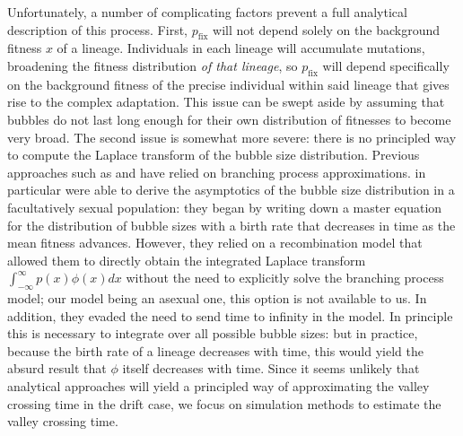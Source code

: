 \documentclass[10pt,twocolumn,twoside]{gsajnl}
\newcommand{\pfix}{p_{\mathrm{fix}}}
\begin{document}
\begin{spacing}{1.5}
Unfortunately, a number of complicating factors prevent a full analytical description of this process.
First, $\pfix$ will not depend solely on the background fitness $x$ of a lineage.
Individuals in each lineage will accumulate mutations, broadening the fitness distribution \emph{of that lineage}, so $\pfix$ will depend specifically on the background fitness of the precise individual within said lineage that gives rise to the complex adaptation.
This issue can be swept aside by assuming that bubbles do not last long enough for their own distribution of fitnesses to become very broad.
The second issue is somewhat more severe: there is no principled way to compute the Laplace transform of the bubble size distribution.
Previous approaches such as \citep{weissman_2009} and \citep{neher_shraiman_2011} have relied on branching process approximations.
\citep{neher_shraiman_2009} in particular were able to derive the asymptotics of the bubble size distribution in a facultatively sexual population: they began by writing down a master equation for the distribution of bubble sizes with a birth rate that decreases in time as the mean fitness advances.
However, they relied on a recombination model that allowed them to directly obtain the integrated Laplace transform $\int_{-\infty}^\infty p(x) \phi(x) dx$ without the need to explicitly solve the branching process model; our model being an asexual one, this option is not available to us.
In addition, they evaded the need to send time to infinity in the model.
In principle this is necessary to integrate over all possible bubble sizes: but in practice, because the birth rate of a lineage decreases with time, this would yield the absurd result that $\phi$ itself decreases with time.
Since it seems unlikely that analytical approaches will yield a principled way of approximating the valley crossing time in the drift case, we focus on simulation methods to estimate the valley crossing time.



\end{spacing}
\end{document}
